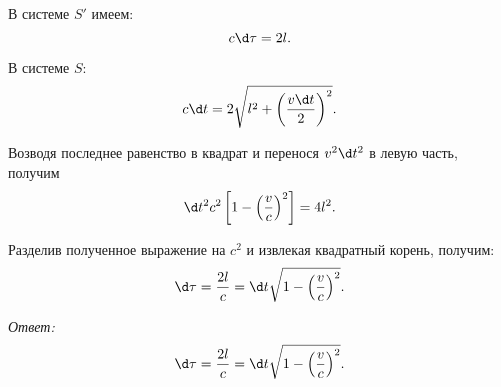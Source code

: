     В системе \( S' \) имеем:
    \[
        c\d\tau = 2l.
    \]
    
    В системе \( S \):
    \[
        c\d t = 2\sqrt{l^2 + \left(\frac{v\d t}{2}\right)^2}.
    \]
    
    Возводя последнее равенство в квадрат и перенося \( v^2\d t^2 \) в левую часть,
    получим
    \[
        \d t^2c^2\left[1 - \left(\frac{v}{c}\right)^2\right] = 4l^2.
    \]
    
    Разделив полученное выражение на \( c^2 \) и извлекая квадратный корень,
    получим:
    \[
        \d\tau = \frac{2l}{c} = \d t\sqrt{1 - \left(\frac{v}{c}\right)^2}.
    \]
    
\vfill
\emph{Ответ:}
    \[
        \d\tau = \frac{2l}{c} = \d t\sqrt{1 - \left(\frac{v}{c}\right)^2}.
    \]

